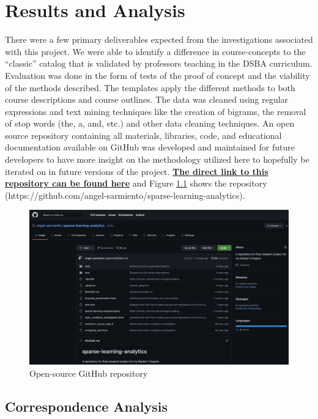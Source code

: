 \chapter{Results and Analysis}


There were a few primary deliverables expected from the investigations associated with this project. We were able to 
identify a difference in course-concepts to the “classic” catalog that is validated by professors teaching in the DSBA 
curriculum. Evaluation was done in the form of tests of the proof of concept and the viability of the methods described.  
The templates apply the different methods to both course descriptions and course outlines. The data was cleaned using 
regular expressions \cite{regex} and text mining techniques like the creation of bigrams, the removal of stop words 
(the, a, and, etc.) and other data cleaning techniques.  An open source repository containing all materials, libraries, 
code, and educational documentation available on GitHub was developed and maintained for future developers to have more 
insight on the methodology utilized here to hopefully be iterated on in future versions of the project.  
 \href{https://github.com/angel-sarmiento/sparse-learning-analytics}{\textbf{The direct link to this repository can be found here}} 
  and Figure \ref{fig:repo} shows the repository (https://github.com/angel-sarmiento/sparse-learning-analytics).  

\begin{figure}[H]
\centering

\includegraphics[width = 1\textwidth, height = .6\textheight]{Content/images/repo.png}
\caption{Open-source GitHub repository}
\label{fig:repo}
\end{figure}


\section{Correspondence Analysis}
\label{ca} 

